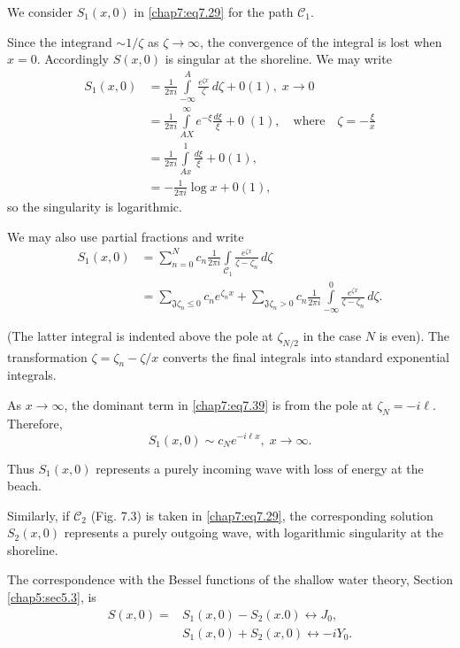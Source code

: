 {{We consider $S_1(x,0)$ in \eqref{chap7:eq7.29} for the path $\mathscr{C}_1$.

Since the integrand $\sim 1/\zeta$ as $\zeta\to\infty$, the convergence of the integral is lost when $x=0$. Accordingly $S(x,0)$ is singular at the shoreline. We may write
\begin{align*}
S_1(x,0) &= \frac{1}{2\pi i}\int\limits_{-\infty}^A\frac{e^{\zeta x}}{\zeta}\,d\zeta+0(1),\; x\to 0\\
& =\frac{1}{2\pi i}\int\limits_{AX}^\infty e^{-\xi}\frac{d\xi}{\xi}+ 0 \; (1), \quad\text{where}\quad\zeta = -\frac{\xi}{x}\\
&=\frac{1}{2\pi i}\int\limits_{Ax}^1\frac{d\xi}{\xi}+0(1),\\
&= -\frac{1}{2\pi i}\log x+0(1),\tag{7.38}\label{chap7:eq7.38}
\end{align*}\pageoriginale
so the singularity is logarithmic.

We may also use partial fractions and write
\begin{align*}
S_1(x,0) &= \sum\limits_{n=0}^N c_n\frac{1}{2\pi i}\int\limits_{\mathscr{C}_1} \frac{e^{\zeta x}}{\zeta-\zeta_n}\,d\zeta\\
&= \sum\limits_{\mathfrak{J}\zeta_n\leq 0}c_n e^{\zeta_nx}+\sum\limits_{\mathfrak{J} \zeta_n >0}c_n\frac{1}{2\pi i}\int\limits_{-\infty}^0 \frac{e^{\zeta x}}{\zeta-\zeta_n} \,d\zeta.\tag{7.39}\label{chap7:eq7.39}
\end{align*}

(The latter integral is indented above the pole at $\zeta_{N/2}$ in the case $N$ is even). The transformation $\zeta=\zeta_n-\zeta/x$ converts the final integrals into standard exponential integrals.

As $x\to\infty$, the dominant term in \eqref{chap7:eq7.39} is from the pole at $\zeta_N=-i\ell$. Therefore,
\begin{equation}
S_1(x,0)\sim c_N e^{-i\ell x},\;x\to\infty.\tag{7.40}\label{chap7:eq7.40}
\end{equation}

Thus $S_1(x,0)$ represents a purely incoming wave with loss of energy at the beach.

Similarly, if $\mathscr{C}_2$ (Fig. 7.3) is taken in \eqref{chap7:eq7.29}, the corresponding solution $S_2(x,0)$ represents a purely outgoing wave, with logarithmic singularity at the shoreline.

The correspondence with the Bessel functions of the shallow water theory, Section \ref{chap5:sec5.3}, is 
\begin{equation}
\begin{aligned}
S(x,0) =& S_1(x,0)-S_2(x.0)\leftrightarrow J_0,\\
&S_1(x,0)+S_2(x,0)\leftrightarrow -iY_0.
\end{aligned}\tag{7.41}\label{chap7:eq7.41}
\end{equation}

}}
